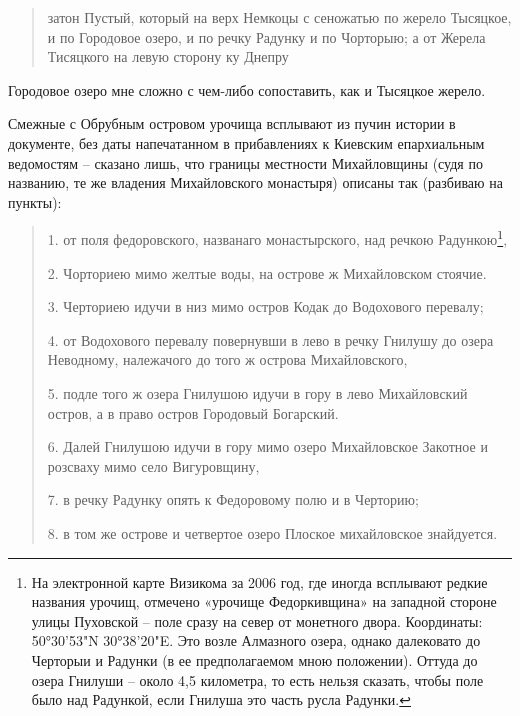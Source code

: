 \begin{quotation}
затон Пустый, который на верх Немкоцы с сеножатью по жерело Тысяцкое, и по Городовое озеро, и по речку Радунку и по Чорторыю; а от Жерела Тисяцкого на левую сторону ку Днепру
\end{quotation}

Городовое озеро мне сложно с чем-либо сопоставить, как и Тысяцкое жерело.



Смежные с Обрубным островом урочища всплывают из пучин истории в документе, без даты напечатанном в прибавлениях к Киевским епархиальным ведомостям\cite{kieparhprib01} – сказано лишь, что границы местности Михайловщины (судя по названию, те же владения Михайловского монастыря) описаны так (разбиваю на пункты):

\begin{quotation}
1. от поля федоровского, названаго монастырского, над речкою Радункою\footnote{На электронной карте Визикома за 2006 год, где иногда всплывают редкие названия урочищ, отмечено «урочище Федоркивщина» на западной стороне улицы Пуховской – поле сразу на север от монетного двора. Координаты: 50°30'53"N 30°38'20"E. Это возле Алмазного озера, однако далековато до Черторыи и Радунки (в ее предполагаемом мною положении). Оттуда до озера Гнилуши – около 4,5 километра, то есть нельзя сказать, чтобы поле было над Радункой, если Гнилуша это часть русла Радунки.},

2. Чорториею мимо желтые воды, на острове ж Михайловском стоячие. 

3. Черториею идучи в низ мимо остров Кодак до Водохового перевалу; 

4. от Водохового перевалу повернувши в лево в речку Гнилушу до озера Неводному, належачого до того ж острова Михайловского, 

5. подле того ж озера Гнилушою идучи в гору в лево Михайловский остров, а в право остров Городовый Богарский.

6. Далей Гнилушою идучи в гору мимо озеро Михайловское Закотное и розсваху мимо село Вигуровщину,

7. в речку Радунку опять к Федоровому полю и в Черторию;

8. в том же острове и четвертое озеро Плоское михайловское знайдуется.
\end{quotation}

